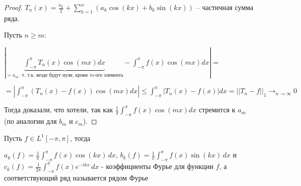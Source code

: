 \begin{proof}

    $T_n (x) = \frac{a_0}{2} + \sum_{k = 1}^n (a_k \cos (kx) + b_k \sin (kx))$ -- частичная сумма ряда.

    Пусть $n \geq m$:

    $|\underbrace{\int_{-\pi}^{\pi} T_n(x) \cos{(m x)} dx}_{= a_m \cdot \pi \text{, т.к. везде будут нули, кроме $m$-ого элемента}} - \int_{-\pi}^{\pi} f(x) \cos{(m x)} dx| =$

    $= |\int_{-\pi}^{\pi} \left(T_n(x) - f(x)\right) \cos{(m x)} dx | \leq \int_{-\pi}^{\pi} |T_n(x) - f(x)| dx = || T_n - f ||_1 \to_{n \to \infty} 0$

    Тогда доказали, что хотели, так как $\frac{1}{\pi} \int_{-\pi}^{\pi} f(x) \cos{(mx)} dx$ стремится к $a_m$ (по аналогии для $b_m$ и $c_m$).


\end{proof}

\begin{definition}
    Пусть $f \in L^1 [-\pi, \pi]$, тогда

    $a_k (f) = \frac{1}{\pi} \int_{-\pi}^\pi f(x) \cos (kx) \, dx$, $b_k (f) = \frac{1}{\pi} \int_{-\pi}^\pi f(x) \sin (kx) \, dx$ и
    $c_k(f) = \frac{1}{2\pi} \int_{-\pi}^\pi f(x) e^{-ikx} \, dx$ - коэффициенты Фурье для функции $f$, а соответствующий ряд называется рядом Фурье
\end{definition}

